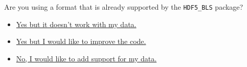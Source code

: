 \begin{tcolorbox}
    Are you using a format that is already supported by the \texttt{HDF5\_BLS} package?
    \begin{itemize}
        \item \hyperref[subsec:load_data.user_specific]{Yes but it doesn't work with my data.}
        \item \hyperref[subsec:load_data.improvement]{Yes but I would like to improve the code.}
        \item \hyperref[subsec:load_data.new_format]{No, I would like to add support for my data.}
    \end{itemize}
\end{tcolorbox}